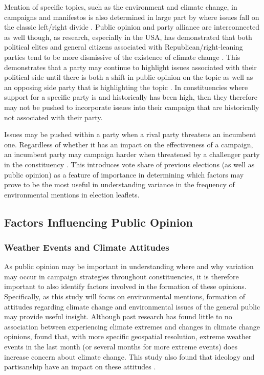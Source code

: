 \documentclass[12pt,letterpaper]{article}
\begin{document}
Mention of specific topics, such as the environment and climate change, in campaigns and manifestos is also determined in large part by where issues fall on the classic left/right divide \autocite{farstadWhatExplainsVariation2018}. Public opinion and party alliance are interconnected as well though, as research, especially in the USA, has demonstrated that both political elites and general citizens associated with Republican/right-leaning parties tend to be more dismissive of the existence of climate change  \autocite{dunlapPoliticalDivideClimate2016,mccrightPoliticizationClimateChange2011}. This demonstrates that a party may continue to highlight issues associated with their political side until there is both a shift in public opinion on the topic as well as an opposing side party that is highlighting the topic \autocite{carterPartyPoliticizationEnvironment2006}. In constituencies where support for a specific party is and historically has been high, then they therefore may not be pushed to incorporate issues into their campaign that are historically not associated with their party. 

Issues may be pushed within a party when a rival party threatens an incumbent one. Regardless of whether it has an impact on the effectiveness of a campaign, an incumbent party may campaign harder when threatened by a challenger party in the constituency \autocite{pattieIncumbentPartiesIncumbent2017a}. This introduces vote share of previous elections (as well as public opinion) as a feature of importance in determining which factors may prove to be the most useful in understanding variance in the frequency of environmental mentions in election leaflets.


\subsection{Factors Influencing Public Opinion}

\subsubsection{Weather Events and Climate Attitudes}

As public opinion may be important in understanding where and why variation may occur in campaign strategies throughout constituencies, it is therefore important to also identify factors involved in the formation of these opinions. Specifically, as this study will focus on environmental mentions, formation of attitudes regarding climate change and environmental issues of the general public may provide useful insight. Although past research has found little to no association between experiencing climate extremes and changes in climate change opinions, \textcite{koniskyExtremeWeatherEvents2016} found that, with more specific geospatial resolution, extreme weather events in the last month (or several months for more extreme events) does increase concern about climate change. This study also found that ideology and partisanship have an impact on these attitudes \autocite{koniskyExtremeWeatherEvents2016}. 
\end{document}
